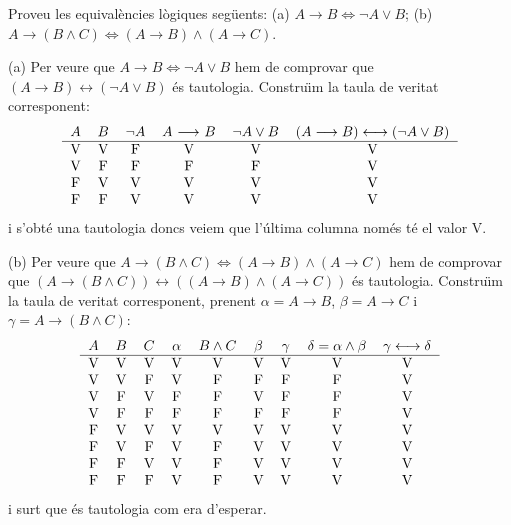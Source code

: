 \begin{exercici}
Proveu les equival\`{e}ncies l\`{o}giques seg\"{u}ents: (a) $A\longrightarrow
B\Longleftrightarrow\lnot A\vee B$; (b) $A\longrightarrow\left(  B\wedge
C\right)  \Longleftrightarrow\left(  A\longrightarrow B\right)  \wedge\left(
A\longrightarrow C\right)  $.
\end{exercici}

\begin{solucio}
(a) Per veure que $A\longrightarrow B\Longleftrightarrow\lnot A\vee B$ hem de
comprovar que $(A\longrightarrow B)\longleftrightarrow\left(  \lnot A\vee
B\right)  $ \'{e}s tautologia. Constru\"{\i}m la taula de veritat
corresponent:%
\[%
\begin{tabular}
[c]{cccccc}%
$A$ & $B$ & $\lnot A$ & $A$ $\longrightarrow$ $B$ & $\lnot A\vee B$ &
$(A\longrightarrow B)\longleftrightarrow\left(  \lnot A\vee B\right)
$\\\hline
V & V & F & V & V & V\\
V & F & F & F & F & V\\
F & V & V & V & V & V\\
F & F & V & V & V & V
\end{tabular}
\]
i s'obt\'{e} una tautologia doncs veiem que l'\'{u}ltima columna nom\'{e}s
t\'{e} el valor V.

(b) Per veure que $A\longrightarrow\left(  B\wedge C\right)
\Longleftrightarrow\left(  A\longrightarrow B\right)  \wedge\left(
A\longrightarrow C\right)  $ hem de comprovar que $(A\longrightarrow\left(
B\wedge C\right)  )\longleftrightarrow\left(  \left(  A\longrightarrow
B\right)  \wedge\left(  A\longrightarrow C\right)  \right)  $ \'{e}s
tautologia. Constru\"{\i}m la taula de veritat corresponent, prenent
$\alpha=A\longrightarrow B$, $\beta=A\longrightarrow C$ i $\gamma
=A\longrightarrow\left(  B\wedge C\right)  $:
\[%
\begin{tabular}
[c]{ccccccccc}%
$A$ & $B$ & $C$ & $\alpha$ & $B\wedge C$ & $\beta$ & $\gamma$ & $\delta
=\alpha\wedge\beta$ & $\gamma\longleftrightarrow\delta$\\\hline
V & V & V & V & V & V & V & V & V\\
V & V & F & V & F & F & F & F & V\\
V & F & V & F & F & V & F & F & V\\
V & F & F & F & F & F & F & F & V\\
F & V & V & V & V & V & V & V & V\\
F & V & F & V & F & V & V & V & V\\
F & F & V & V & F & V & V & V & V\\
F & F & F & V & F & V & V & V & V
\end{tabular}
\]
i surt que \'{e}s tautologia com era d'esperar.
\end{solucio}

